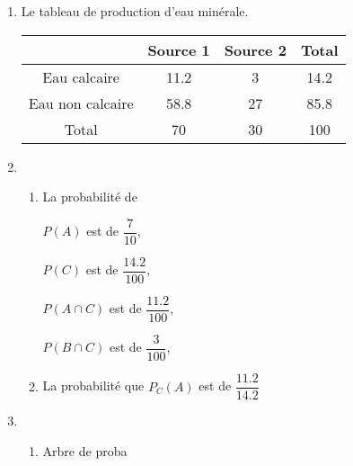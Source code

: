 \documentclass[12pt,a4paper]{article}
\begin{document}
\begin{center}
        \shadowbox{\begin{large}
                \textcolor{black}{Exercice de maths}
        \end{large}}
    \end{center}
    \vspace{0.5 cm}
\begin{enumerate}
	\item Le tableau de production d'eau minérale. 
	\begin{table}[ht]
   		\centering
   		\begin{tabular}{|c|c|c|c|}
  			\hline
			 					& Source 1 	& Source 2 	& Total 	\\
		   \hline 
			Eau calcaire 		& 11.2 		& 3 		& 14.2		\\
			\hline
			Eau non calcaire 	& 58.8		& 27		& 85.8		\\
		   \hline
			Total 				& 70 		& 30  		& 100  		\\
		   \hline

   		\end{tabular}
	\end{table}
\item \begin{enumerate}
	\item La probabilité de\par
			$P(A)$ est de $\dfrac{7}{10}$,\par
			$P(C)$ est de $\dfrac{14.2}{100}$,\par
			$P(A\cap C)$ est de $\dfrac{11.2}{100}$,\par
			$P(B \cap C)$ est de $\dfrac{3}{100}$,\par
	\item	La probabilité que $P_C(A)$ est de $\dfrac{11.2}{14.2}$
\end{enumerate}
    \vspace{0.5 cm}
\item \begin{enumerate}
	\item Arbre de proba



\end{enumerate}
\end{enumerate}
\end{document}
